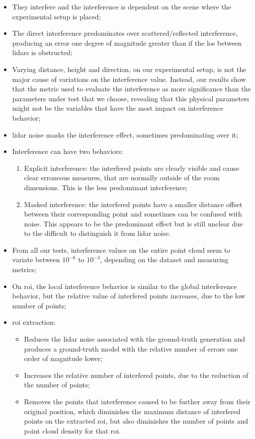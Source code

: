 \begin{itemize}
	\item They interfere and the interference is dependent on the scene where the experimental setup is placed;
	\item The direct interference predominates over scattered/reflected interference, producing an error one degree of magnitude greater than if the \ac{los} between \acp{lidar} is obstructed; %
	\item Varying distance, height and direction, on our experimental setup, is not the major cause of variations on the interference value. Instead, our results show that the metric used to evaluate the interference as more significance than the parameters under test that we choose, revealing that this physical parameters might not be the variables that have the most impact on interference behavior;
	\item \ac{lidar} noise masks the interference effect, sometimes predominating over it;
	\item Interference can have two behaviors: 
		\begin{enumerate}
			\item Explicit interference: the interfered points are clearly visible and cause clear erroneous measures, that are normally outside of the room dimensions. This is the less predominant interference;
			\item Masked interference: the interfered points have a smaller distance offset between their corresponding point and sometimes can be confused with noise. This appears to be the predominant effect but is still unclear due to the difficult to distinguish it from \ac{lidar} noise.
		\end{enumerate}
	\item From all our tests, interference values on the entire point cloud seem to variate between $10^{-6}$ to $10^{-3}$, depending on the dataset and measuring metrics;
	\item On \ac{roi}, the local interference behavior is similar to the global interference behavior, but the relative value of interfered points increases, due to the low number of points;
	\item \ac{roi} extraction:
		\begin{itemize}
			\item Reduces the \ac{lidar} noise associated with the ground-truth generation and produces a ground-truth model with the relative number of errors one order of magnitude lower;
			\item Increases the relative number of interfered points, due to the reduction of the number of points;
			\item Removes the points that interference caused to be further away from their original position, which diminishes the maximum distance of interfered points on the extracted \ac{roi}, but also diminishes the number of points and point cloud density for that \ac{roi}.
			\end{itemize} 
\end{itemize}

